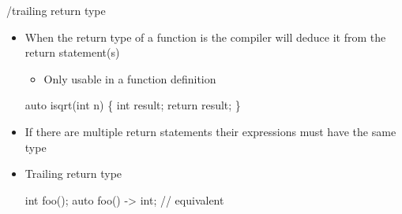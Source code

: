 \begin{frame}[fragile]{/trailing return type}

  \begin{itemize}
  \item When the return type of a function is  the compiler will
    deduce it from the return statement(s)
    \begin{itemize}
    \item Only usable in a function definition
    \end{itemize}

    \begin{codeblock}
auto isqrt(int n)
\{
  int result;
  \ddd
  return result;
\}
\end{codeblock}

  \item<2-> If there are multiple return statements their expressions must have the
    same type
  \item<3-> Trailing return type
    \begin{codeblock}
int foo(\ddd);
auto foo(\ddd) -> int; // equivalent\end{codeblock}

  \end{itemize}

\end{frame}


